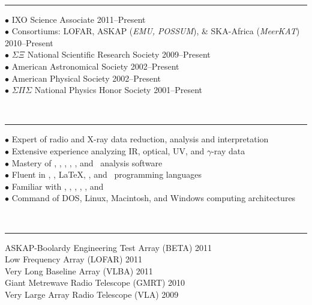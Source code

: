 \documentclass[12pt]{cv}
\begin{document}
{\large{}}\vspace{-0.3cm}\\
\rule{\linewidth}{0.5pt}
{\scriptsize{$\bullet$}} IXO Science Associate \hfill 2011--Present\\
{\scriptsize{$\bullet$}} Consortiums: LOFAR, ASKAP ({\it{EMU, POSSUM}}), \& SKA-Africa ({\it{MeerKAT}}) \hfill 2010--Present\\
{\scriptsize{$\bullet$}} $\Sigma \Xi$ National Scientific Research Society \hfill 2009--Present\\
{\scriptsize{$\bullet$}} American Astronomical Society \hfill 2002--Present\\
{\scriptsize{$\bullet$}} American Physical Society \hfill 2002--Present\\
{\scriptsize{$\bullet$}} $\Sigma \Pi \Sigma$ National Physics Honor Society \hfill 2001--Present

{\large{}}\vspace{-0.3cm}\\
\rule{\linewidth}{0.5pt}
{\scriptsize{$\bullet$}} Expert of radio and X-ray data reduction, analysis and interpretation\\
{\scriptsize{$\bullet$}} Extensive experience analyzing IR, optical, UV, and $\gamma$-ray data\\
{\scriptsize{$\bullet$}} Mastery of \aips, \casa, \ciao, \iraf, \osa, and \sas\ analysis software\\
{\scriptsize{$\bullet$}} Fluent in \html, \idl, \LaTeX, \perl, and \python\ programming languages\\
{\scriptsize{$\bullet$}} Familiar with \clang, \fortran, \meq, \mysql, \supmo, and \tickle\\
{\scriptsize{$\bullet$}} Command of DOS, Linux, Macintosh, and Windows computing architectures

{\large{}}\vspace{-0.3cm}\\
\rule{\linewidth}{0.5pt}
ASKAP-Boolardy Engineering Test Array (BETA) \hfill 2011\\
Low Frequency Array (LOFAR) \hfill 2011\\
Very Long Baseline Array (VLBA) \hfill 2011\\
Giant Metrewave Radio Telescope (GMRT) \hfill 2010\\
Very Large Array Radio Telescope (VLA) \hfill 2009
\end{document}
